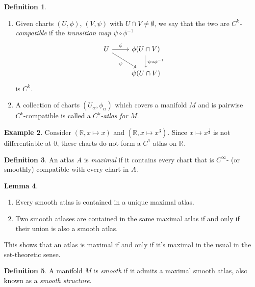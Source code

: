 \documentclass[10pt,letterpaper,cm]{nupset}
\theoremstyle{definition}
\newtheorem{definition}{Definition}[subsection]
\newtheorem{exmp}[definition]{Example}
\theoremstyle{theorem}
\newtheorem{lemma}[definition]{Lemma}
\theoremstyle{remark}
\newcommand{\R}{\mathbb R}
\newcommand{\1}{\mathbf{1}}
\newcommand{\0}{\vec 0}
\begin{document}
\begin{definition} $ $
\begin{enumerate}
\item 
Given charts $(U, \phi)$, $(V, \psi)$ with $U \cap V \ne \emptyset$, we say that the two are \textit{$C^k$-compatible} if the \textit{transition map $\psi \circ \phi^{-1}$}
 \[
  \begin{tikzcd}
    U \arrow{r}{\phi} \arrow[swap]{dr}{\psi} & \phi(U\cap V) \arrow{d}{\psi \circ \phi^{-1}} \\
     & \psi(U \cap V)
  \end{tikzcd}
\]
is $C^k$.
\item A collection of charts $(U_\alpha, \phi_\alpha)$ which covers a manifold $M$ and is pairwise $C^k$-compatible is called a \textit{$C^k$-atlas for $M$}.
\end{enumerate}
\end{definition}

\begin{exmp}
Consider $(\R, x \mapsto x)$ and $(\R, x \mapsto x^3)$. Since $x \mapsto x^{\frac{1}{3}}$ is not differentiable at $0$, these charts do not form a $C^1$-atlas on $\R$.
\end{exmp}


\begin{definition}{An atlas $A$ is \textit{maximal} if it contains every chart that is $C^{\infty}$- (or smoothly) compatible with every chart in $A$.}
\end{definition}

\begin{lemma}\label{l1} $ $


\begin{enumerate}
\item Every smooth atlas is contained in a unique maximal atlas.
\item Two smooth atlases are contained in the same maximal atlas  if and only if their union is also a smooth atlas.
\end{enumerate}

\end{lemma}



This shows that an atlas is maximal  if and only if it's maximal in the usual in the set-theoretic sense.

\theoremstyle{definition}
\begin{definition}{A manifold $M$ is \textit{smooth} if it admits a maximal smooth atlas, also known as a \textit{smooth structure}.}
\end{definition}
\end{document}
